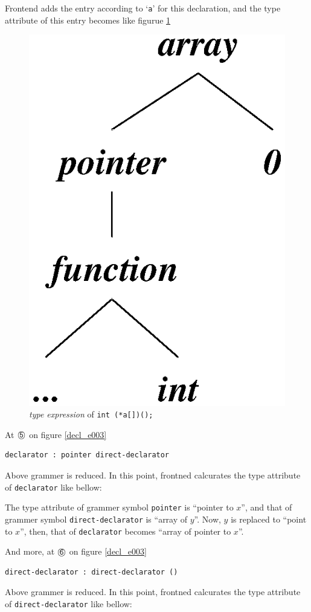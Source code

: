  Frontend adds the entry according to `{\tt{a}}'
for this declaration, and the type attribute of this entry becomes
like figurue \ref{decl_e004}
\begin{figure}[htbp]
\begin{center}
\includegraphics[width=0.5\linewidth,height=0.6\linewidth]{decl004.eps}
\caption{{\em type expression} of {\tt{int (*a[])();}}}
\label{decl_e004}
\end{center}
\end{figure}

At ${\MARU{\tt 5}}$ on figure \ref{decl_e003}
\begin{verbatim}
declarator : pointer direct-declarator
\end{verbatim}
Above grammer is reduced. In this point, frontned calcurates
the type attribute of {\tt{declarator}} like bellow:

The type attribute of grammer symbol {\tt{pointer}} 
is ``pointer to $x$'', and that of grammer symbol
{\tt{direct-declarator}} is ``array of $y$''.
Now, $y$ is replaced to ``point to $x$'',
then, that of {\tt{declarator}} becomes
``array of pointer to $x$''.

And more, at ${\MARU{\tt 6}}$ on figure \ref{decl_e003}
\begin{verbatim}
direct-declarator : direct-declarator ()
\end{verbatim}
Above grammer is reduced. In this point, frontned calcurates
the type attribute of {\tt{direct-declarator}} like bellow:

